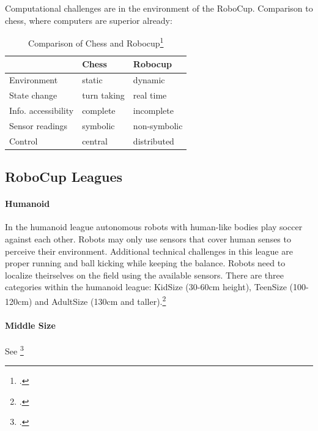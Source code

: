 Computational challenges are in the environment of the RoboCup.
Comparison to chess, where computers are superior already:

\begin{table}[htbp]
\centering
\begin{savenotes}
\begin{tabular*}{0.7\textwidth}{p{} p{} p{}}
\toprule
                    &\textbf{Chess} & \textbf{Robocup} \\
\midrule 
Environment         & static		& dynamic \\
State change        & turn taking   & real time \\
Info. accessibility & complete      & incomplete \\
Sensor readings     & symbolic      & non-symbolic \\
Control             & central       & distributed \\
\bottomrule 
\end{tabular*}
  \caption[Comparison of Chess and Robocup]{Comparison of Chess and Robocup\footcite[][]{robo_objectives}}
  \label{tab:chess_comparison}
\end{savenotes}
\end{table}

\subsection{RoboCup Leagues \label{sec:robo-leagues}}


\paragraph{Humanoid}
In the humanoid league autonomous robots with human-like bodies play soccer
against each other.
Robots may only use sensors that cover human senses to perceive their
environment. Additional technical challenges in this league are proper running and ball
kicking while keeping the balance. Robots need to localize theirselves on the
field using the available sensors.
There are three categories within the humanoid league: KidSize (30-60cm height),
TeenSize (100-120cm) and AdultSize (130cm and taller).\footcite[Cf.][]{robo_humanoid_wiki}
 
\paragraph{Middle Size} See \footcite[Cf.][]{robo_ms_wiki}
 
